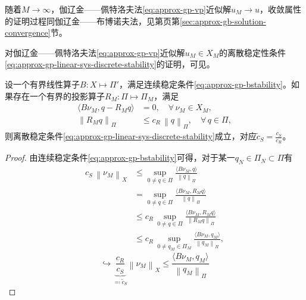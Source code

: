 随着$M \rightarrow \infty$，伽辽金——佩特洛夫法\eqref{eq:approx-gp-vp}近似解$u_{M} \rightarrow u$，收敛属性的证明过程同伽辽金——布博诺夫法，见第\pageref{sec:approx-gb-solution-convergence}页第\ref{sec:approx-gb-solution-convergence}节。

对伽辽金——佩特洛夫法\eqref{eq:approx-gp-vp}近似解$u_{M} \in X_{M}$的离散稳定性条件\eqref{eq:approx-gp-linear-sys-discrete-stability}的证明，可见\cite{Fortin:1977vh}。
\begin{lemma}[离散稳定性条件]
  \label{lemma:approx-gp-stability-discrete}
  设一个有界线性算子$B:X \mapsto \Pi'$，满足连续稳定条件\eqref{eq:approx-gp-bstability}。如果存在一个有界的投影算子$R_{M}:\Pi \mapsto \Pi_{M}$，满足
  \begin{equation*}
    \begin{split}
      \langle B \nu_{M}, q - R_{M} q \rangle & = 0, \quad \forall \, \nu_{M} \in X_{M}, \\
      \left\| R_{M} q \right\|_{\Pi} &\le c_{R} \, \left\|q\right\|_{\Pi}, \quad \forall \, q \in \Pi,
    \end{split}
  \end{equation*}
  则离散稳定条件\eqref{eq:approx-gp-linear-sys-discrete-stability}成立，对应$\tilde{c}_{S} = \frac{c_{S}}{c_{R}}$。
\end{lemma}
\begin{proof}
  由连续稳定条件\eqref{eq:approx-gp-bstability}可得，对于某一$q_{N} \in \Pi_{N} \subset \Pi$有
  \begin{equation*}
    \begin{split}
      c_{S} \, \left\| \nu_{M} \right\|_{X}
      & \le \sup_{0 \neq q \in \Pi}
      \frac{
      \langle B \nu_{M},q \rangle
      }{
      \left\| q \right\|_{\Pi}
      } \\
      & = \sup_{0 \neq q \in \Pi}
      \frac{
      \langle B \nu_{M}, R_{M} q \rangle
      }{
      \left\| q \right\|_{\Pi}
      }\\
      & \le c_{R} \, \sup_{0 \neq q \in \Pi}
      \frac{
      \langle B \nu_{M}, R_{M} q \rangle
      }{
      \left\| R_{M} q \right\|_{\Pi}
      } \\
      & \le c_{R} \, \sup_{0 \neq q_{M} \in \Pi_{M}}
      \frac{
      \langle B \nu_{M}, q_{M} \rangle
      }{
      \left\| q_{M} \right\|_{\Pi}
      },
    \end{split}
  \end{equation*}
  \begin{equation*}
    \hookrightarrow \underbrace{\frac{c_{R}}{c_{S}}}_{\eqqcolon \tilde{c}_{S}}\left\| \nu_{M} \right\|_{X} \le
    \frac{
    \langle B \nu_{M}, q_{M} \rangle
    }{
    \left\| q_{M} \right\|_{\Pi}
    }
  \end{equation*}
\end{proof}


